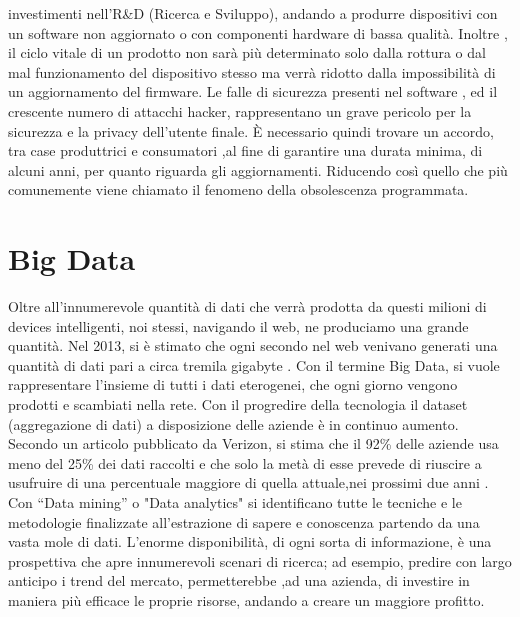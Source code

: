 investimenti nell'R\&D (Ricerca e Sviluppo), andando a produrre dispositivi con
un software non aggiornato o con componenti hardware di bassa qualità. Inoltre
, il ciclo vitale di un prodotto non sarà più determinato solo dalla
rottura o dal mal funzionamento del dispositivo stesso ma verrà ridotto dalla
impossibilità di un aggiornamento del firmware.
Le falle di sicurezza presenti nel software , ed il crescente  numero di
attacchi hacker, rappresentano un grave  pericolo per la sicurezza e la privacy
dell'utente finale.
È necessario quindi trovare un accordo, tra case produttrici e
consumatori ,al fine di garantire una durata minima, di alcuni anni, per quanto
riguarda gli aggiornamenti. Riducendo così quello che più comunemente
viene chiamato il fenomeno della obsolescenza programmata. 
\section{Big Data}
Oltre all'innumerevole quantità di dati che verrà prodotta da questi milioni di
devices intelligenti, noi stessi,  navigando il web, ne produciamo una grande
quantità. Nel 2013, si è stimato che ogni secondo nel web venivano generati una
quantità di dati pari a circa tremila gigabyte . Con il  termine Big Data, si vuole
rappresentare l'insieme di tutti i dati eterogenei, che ogni giorno vengono
prodotti e scambiati nella rete.
Con il progredire della tecnologia il dataset (aggregazione di dati) a
disposizione delle aziende è in continuo aumento.
Secondo un articolo pubblicato da Verizon, si stima che il 92\% delle aziende
usa meno del 25\% dei dati raccolti e che solo la metà  di esse prevede di
riuscire a usufruire di una percentuale maggiore di quella attuale,nei prossimi due anni
\cite{VerizionIoT}.  Con “Data mining” o "Data analytics"  si identificano tutte le
tecniche e le metodologie finalizzate all’estrazione di sapere e conoscenza
partendo da una vasta mole di dati.
L’enorme disponibilità, di ogni sorta di informazione, è una prospettiva che 
apre innumerevoli scenari di ricerca; ad esempio, predire con largo anticipo i 
trend del mercato, permetterebbe ,ad una azienda, di investire in maniera più
efficace le proprie risorse, andando a creare un maggiore profitto.


